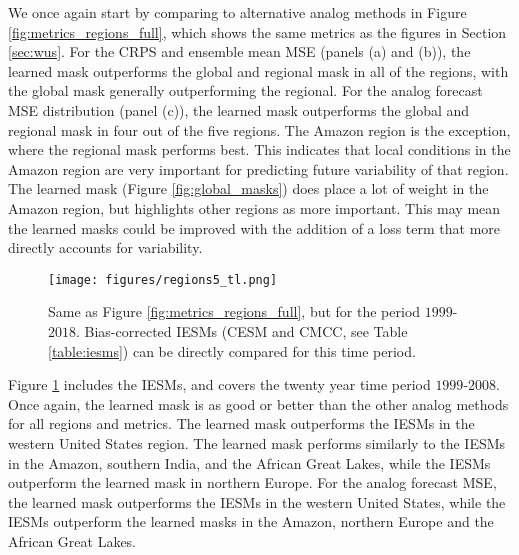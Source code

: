 We once again start by comparing to alternative analog methods in Figure \ref{fig:metrics_regions_full}, which shows the same metrics as the figures in Section \ref{sec:wus}.
For the CRPS and ensemble mean MSE (panels (a) and (b)), the learned mask outperforms the global and regional mask in all of the regions, with the global mask generally outperforming the regional.
For the analog forecast MSE distribution (panel (c)), the learned mask outperforms the global and regional mask in four out of the five regions.
The Amazon region is the exception, where the regional mask performs best.
This indicates that local conditions in the Amazon region are very important for predicting future variability of that region.
The learned mask (Figure \ref{fig:global_masks}) does place a lot of weight in the Amazon region, but highlights other regions as more important.
This may mean the learned masks could be improved with the addition of a loss term that more directly accounts for variability.

\begin{figure}[h!]
    \centering
    \noindent\texttt{[image: figures/regions5\_tl.png]}
    \caption{Same as Figure \ref{fig:metrics_regions_full}, but for the period $1999$-$2018$.
    Bias-corrected IESMs (CESM and CMCC, see Table \ref{table:iesms}) can be directly compared for this time period.
    }
    \label{fig:metrics_regions_tl}
\end{figure}

Figure \ref{fig:metrics_regions_tl} includes the IESMs, and covers the twenty year time period $1999$-$2008$.
Once again, the learned mask is as good or better than the other analog methods for all regions and metrics.
The learned mask outperforms the IESMs in the western United States region.
The learned mask performs similarly to the IESMs in the Amazon, southern India, and the African Great Lakes, while the IESMs outperform the learned mask in northern Europe.
For the analog forecast MSE, the learned mask outperforms the IESMs in the western United States, while the IESMs outperform the learned masks in the Amazon, northern Europe and the African Great Lakes.

